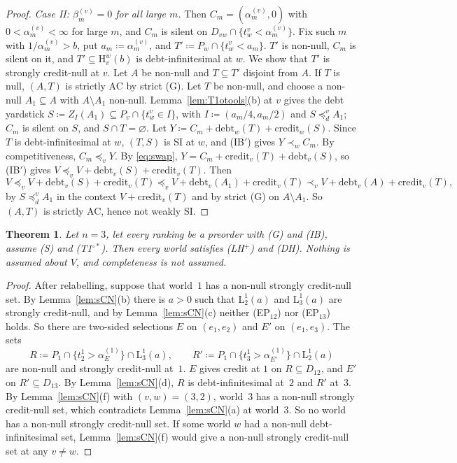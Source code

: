 \documentclass[11pt]{article}
\newtheorem{theorem}{Theorem}
\theoremstyle{definition}\newtheorem{definition}[theorem]{Definition}
\theoremstyle{remark}\newtheorem{remark}[theorem]{Remark}
\newcommand{\debt}{\mathrm{debt}}
\newcommand{\cred}{\mathrm{credit}}
\newcommand{\Lo}[3]{\mathrm L^{#1}_{#2}(#3)}
\newcommand{\Hi}[3]{\mathrm H^{#1}_{#2}(#3)}
\newcommand{\Tos}{\textup{(T1$^{\circ*}$)}}
\begin{document}
\begin{proof}
\emph{Case II: $\beta^{(v)}_m=0$ for all large $m$.} Then
$C_m=(\alpha^{(v)}_m,0)$ with $0<\alpha^{(v)}_m<\infty$ for large $m$, and
$C_m$ is silent on $D_{vw}\cap\{t^v_w<\alpha^{(v)}_m\}$. Fix such $m$ with
$1/\alpha^{(v)}_m>b$, put $a_m\coloneqq\alpha^{(v)}_m$, and
$T'\coloneqq P_w\cap\{t^v_w<a_m\}$. $T'$ is non-null, $C_m$ is silent on
it, and $T'\subseteq\Hi wvb$ is debt-infinitesimal at $w$. We show that $T'$
is strongly credit-null at $v$. Let $A$ be non-null and $T\subseteq T'$
disjoint from $A$. If $T$ is null, $(A,T)$ is strictly AC by strict (G).
Let $T$ be non-null, and choose a non-null $A_1\subseteq A$ with
$A\setminus A_1$ non-null. Lemma~\ref{lem:T1otools}(b) at $v$ gives the
debt yardstick $S\coloneqq Z_I(A_1)\subseteq P_v\cap\{t^v_w\in I\}$, with
$I\coloneqq(a_m/4,a_m/2)$ and $S\preceq^v_dA_1$; $C_m$ is silent on $S$,
and $S\cap T=\varnothing$. Let $Y\coloneqq C_m+\debt_w(T)+\cred_w(S)$.
Since $T$ is debt-infinitesimal at $w$, $(T,S)$ is SI at $w$, and (IB$'$)
gives $Y\prec_wC_m$. By competitiveness, $C_m\preceq_vY$. By
\eqref{eq:swap}, $Y=C_m+\cred_v(T)+\debt_v(S)$, so (IB$'$) gives
$V\preceq_vV+\debt_v(S)+\cred_v(T)$. Then
\[
 V\preceq_vV+\debt_v(S)+\cred_v(T)\preceq_vV+\debt_v(A_1)+\cred_v(T)\prec_v
 V+\debt_v(A)+\cred_v(T),
\]
by $S\preceq^v_dA_1$ in the context $V+\cred_v(T)$ and by strict (G) on
$A\setminus A_1$. So $(A,T)$ is strictly AC, hence not weakly SI.
\end{proof}

\begin{theorem}\label{thm:LH}
Let $n=3$, let every ranking be a preorder with (G) and (IB), assume (S)
and \Tos. Then every world satisfies (LH$^+$) and (DH). Nothing is assumed
about $V$, and completeness is not assumed.
\end{theorem}
\begin{proof}
After relabelling, suppose that world~$1$ has a non-null strongly
credit-null set. By Lemma~\ref{lem:sCN}(b) there is $a>0$ such that $\Lo12a$ and
$\Lo13a$ are strongly credit-null, and by Lemma~\ref{lem:sCN}(c) neither
(EP$_{12}$) nor (EP$_{13}$) holds. So there are two-sided selections $E$ on
$(e_1,e_2)$ and $E'$ on $(e_1,e_3)$. The sets
\[
 R\coloneqq P_1\cap\{t^1_2>\alpha^{(1)}_E\}\cap\Lo13a,\qquad
 R'\coloneqq P_1\cap\{t^1_3>\alpha^{(1)}_{E'}\}\cap\Lo12a
\]
are non-null and strongly credit-null at~$1$. $E$ gives credit at $1$ on
$R\subseteq D_{12}$, and $E'$ on $R'\subseteq D_{13}$. By
Lemma~\ref{lem:sCN}(d), $R$ is debt-infinitesimal at~$2$ and $R'$ at~$3$. By
Lemma~\ref{lem:sCN}(f) with $(v,w)=(3,2)$, world~$3$ has a non-null
strongly credit-null set, which contradicts Lemma~\ref{lem:sCN}(a) at
world~$3$. So no world has a non-null strongly credit-null set. If some
world $w$ had a non-null debt-infinitesimal set, Lemma~\ref{lem:sCN}(f)
would give a non-null strongly credit-null set at any $v\ne w$.
\end{proof}
\end{document}
